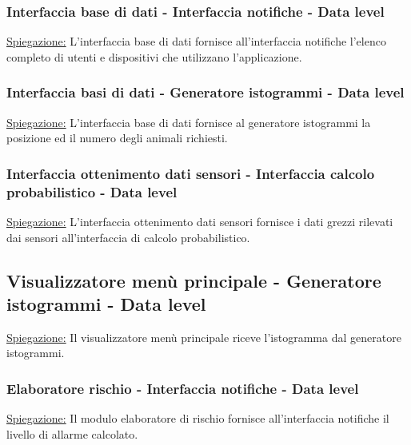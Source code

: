 \subsubsection*{Interfaccia base di dati - Interfaccia notifiche - Data level}
\underline{Spiegazione:} L'interfaccia base di dati fornisce all'interfaccia notifiche l'elenco completo di utenti e dispositivi che utilizzano l'applicazione.

\subsubsection*{Interfaccia basi di dati - Generatore istogrammi - Data level}
\underline{Spiegazione:} L'interfaccia base di dati fornisce al generatore istogrammi la posizione ed il numero degli animali richiesti.

\subsubsection*{Interfaccia ottenimento dati sensori - Interfaccia calcolo probabilistico - Data level}
\underline{Spiegazione:} L'interfaccia ottenimento dati sensori fornisce i dati grezzi rilevati dai sensori all'interfaccia di calcolo probabilistico.

\subsection*{Visualizzatore menù principale - Generatore istogrammi - Data level}
\underline{Spiegazione:} Il visualizzatore menù principale riceve l'istogramma dal generatore istogrammi.

\subsubsection*{Elaboratore rischio - Interfaccia notifiche - Data level}
\underline{Spiegazione:} Il modulo elaboratore di rischio fornisce all'interfaccia notifiche il livello di allarme calcolato.

